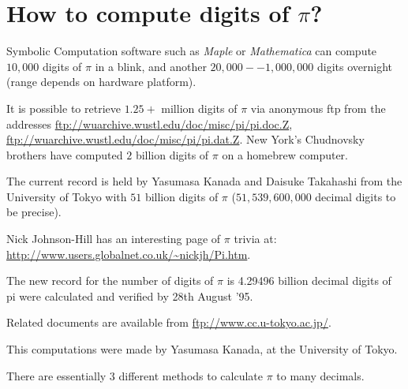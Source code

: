 \section{How to compute digits of $\pi$?}


    Symbolic Computation software such as {\it Maple} or {\it Mathematica}
    can compute $10,000$ digits of $\pi$ in a blink,
    and another $20,000--1,000,000$ digits overnight (range depends
    on hardware platform).

    It is possible to retrieve $1.25+$ million digits of $\pi$ via anonymous
    ftp from the addresses
    \url{ftp://wuarchive.wustl.edu/doc/misc/pi/pi.doc.Z},
    \url{ftp://wuarchive.wustl.edu/doc/misc/pi/pi.dat.Z}.
    New York's Chudnovsky brothers have computed $2$ billion digits of $\pi$
    on a homebrew computer.

The current record is held by Yasumasa Kanada and Daisuke Takahashi 
from the University of Tokyo
with $51$ billion digits of $\pi$ ($51,539,600,000$ decimal
digits to be precise).

Nick Johnson-Hill has an interesting page of $\pi$ 
trivia at: \url{http://www.users.globalnet.co.uk/~nickjh/Pi.htm}.


%
%
%
%


%
The new record for the number of digits of $\pi$ is 4.29496 billion
decimal digits of pi were calculated and verified by 28th August '95.

 Related documents are available from \url{ftp://www.cc.u-tokyo.ac.jp/}.

This computations were made by Yasumasa Kanada, at the University of Tokyo.



    There are essentially 3 different methods to calculate $\pi$
 to many decimals.

